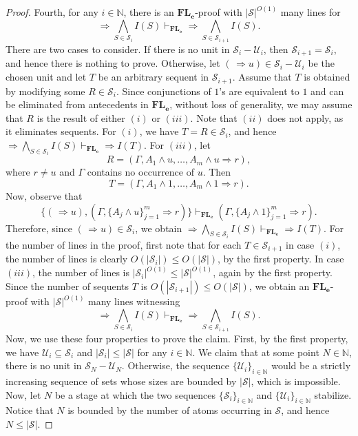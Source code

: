 \documentclass[10pt,a4paper]{amsart}
\begin{document}
\begin{proof}
Fourth, for any $i\in\mathbb{N}$, there is an $\mathbf{FL_e}$-proof with
$|\mathcal{S}|^{O(1)}$ many lines for
\[
\Rightarrow\bigwedge_{S\in\mathcal{S}_i} I(S)
\vdash_{\mathbf{FL_e}}
\Rightarrow\bigwedge_{S\in\mathcal{S}_{i+1}} I(S).
\]
There are two cases to consider. If there is no unit in
$\mathcal{S}_i-\mathcal{U}_i$, then
$\mathcal{S}_{i+1}=\mathcal{S}_i$, and hence there is nothing to prove.
Otherwise, let $(\,\Rightarrow u)\in\mathcal{S}_i-\mathcal{U}_i$ be the
chosen unit and let $T$ be an arbitrary sequent in $\mathcal{S}_{i+1}$.
Assume that $T$ is obtained by modifying some $R\in\mathcal{S}_i$.
Since conjunctions of $1$'s are equivalent to $1$ and can be eliminated
from antecedents in $\mathbf{FL_e}$, without loss of generality, we may
assume that $R$ is the result of either $(i)$ or $(iii)$. Note that $(ii)$
does not apply, as it eliminates sequents.
For $(i)$, we have $T=R\in\mathcal{S}_i$, and hence
$
\Rightarrow\bigwedge_{S\in\mathcal{S}_i} I(S)
\vdash_{\mathbf{FL_e}}
\Rightarrow I(T).
$
For $(iii)$, let
\[
R=(\Gamma,A_1\wedge u,\ldots,A_m\wedge u\Rightarrow r),
\]
where $r\neq u$ and $\Gamma$ contains no occurrence of $u$. Then
\[
T=(\Gamma,A_1\wedge1,\ldots,A_m\wedge1\Rightarrow r).
\]
Now, observe that
\[
\{(\,\Rightarrow u),
(\Gamma,\{A_j\wedge u\}_{j=1}^m\Rightarrow r)\}
\vdash_{\mathbf{FL_e}}
(\Gamma,\{A_j\wedge1\}_{j=1}^m\Rightarrow r).
\]
Therefore, since $(\,\Rightarrow u)\in\mathcal{S}_i$, we obtain
$
\Rightarrow\bigwedge_{S\in\mathcal{S}_i} I(S)
\vdash_{\mathbf{FL_e}}
\Rightarrow I(T).
$
For the number of lines in the proof, first note that for each
$T\in\mathcal{S}_{i+1}$ in case $(i)$, the number of lines is clearly
$O(|\mathcal{S}_i|)\leq O(|\mathcal{S}|)$, by the first property. In case
$(iii)$, the number of lines is
$|\mathcal{S}_i|^{O(1)}\leq|\mathcal{S}|^{O(1)}$, again by the first
property. Since the number of sequents $T$ is
$O(|\mathcal{S}_{i+1}|)\leq O(|\mathcal{S}|)$, we obtain an
$\mathbf{FL_e}$-proof with $|\mathcal{S}|^{O(1)}$ many lines witnessing
\[
\Rightarrow\bigwedge_{S\in\mathcal{S}_i} I(S)
\vdash_{\mathbf{FL_e}}
\Rightarrow\bigwedge_{S\in\mathcal{S}_{i+1}} I(S).
\]
Now, we use these four properties to prove the claim. First, by the first
property, we have $\mathcal{U}_i\subseteq\mathcal{S}_i$ and
$|\mathcal{S}_i|\leq|\mathcal{S}|$ for any $i\in\mathbb{N}$. We claim that
at some point $N\in\mathbb{N}$, there is no unit in
$\mathcal{S}_N-\mathcal{U}_N$. Otherwise, the sequence
$\{\mathcal{U}_i\}_{i\in\mathbb{N}}$ would be a strictly increasing
sequence of sets whose sizes are bounded by $|\mathcal{S}|$, which is
impossible. Now, let $N$ be a stage at which the two sequences
$\{\mathcal{S}_i\}_{i\in\mathbb{N}}$ and
$\{\mathcal{U}_i\}_{i\in\mathbb{N}}$ stabilize. Notice that $N$ is bounded
by the number of atoms occurring in $\mathcal{S}$, and hence
$N\leq|\mathcal{S}|$.


\end{proof}
\end{document}

